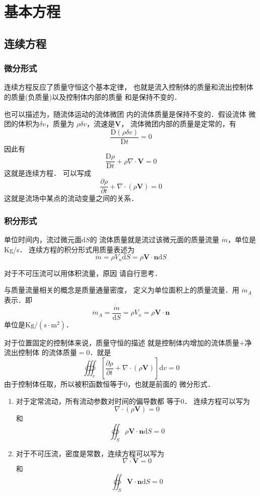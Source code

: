 
\chapter{基本方程}
\section{连续方程}
\subsection{微分形式}
连续方程反应了质量守恒这个基本定律，
也就是流入控制体的质量和流出控制体
的质量(负质量)以及控制体内部的质量
和是保持不变的．

也可以描述为，随流体运动的流体微团
内的流体质量是保持不变的．假设流体
微团的体积为$\delta v$，质量为
$\rho \delta v$，流速是$\mathbf{V}$，
流体微团内部的质量是定常的，有
\[
	\frac{\mathrm{D}(\rho \delta v)}{\mathrm{D} t }=0
\]
因此有
\[
	\frac{\mathrm{D}\rho}{\mathrm{D}t }+\rho
	\nabla \cdot \mathbf{V}=0
\]
这就是连续方程．
可以写成
\[
	\frac{\partial \rho}{\partial t }+
	\nabla \cdot (\rho \mathbf{V})=0
\]
这就是流场中某点的流动变量之间的关系．

\subsection{积分形式}
单位时间内，流过微元面$\mathrm{d} S $的
流体质量就是流过该微元面的质量流量
$\dot{m}$，单位是Kg/s．
连续方程的积分形式用质量表述为
\[
	\dot{m}=\rho V_n \mathrm{d}S=
	\rho \mathbf{V}\cdot \mathbf{n}
	\mathrm{d} S
\]
\begin{note}
	对于不可压流可以用体积流量，原因
	请自行思考．
\end{note}

与质量流量相关的概念是质量通量密度，
定义为单位面积上的质量流量．用
$\dot{m}_A$表示．即
\[
	\dot{m}_A=\frac{\dot{m}}{\mathrm{d} S }=
	\rho V_n =\rho \mathbf{V} \cdot \mathbf{n}
\]
单位是$\mathrm{Kg /(s\cdot m^2)}$．

对于位置固定的控制体来说，质量守恒的描述
就是控制体内增加的流体质量+净流出控制体
的流体质量$=0$．就是
\[
	\oiiint_v \left[\frac{\partial \rho}{\partial t }
		+\nabla \cdot (\rho \mathbf{V})\right]\mathrm{d}v
	=0
\]
由于控制体任取，所以被积函数恒等于0，也就是前面的
微分形式．

\begin{notice}
	\begin{enumerate}
		\item 对于定常流动，所有流动参数对时间的偏导数都
		      等于0．
		      连续方程可以写为
		      \[
			      \nabla \cdot (\rho\mathbf{V})=0
		      \]
		      和
		      \[
			      \oiint_S \rho \mathbf{V}\cdot \mathbf{n}
			      \mathrm{d} S=0
		      \]
		\item 对于不可压流，密度是常数，连续方程可以写为
		      \[
			      \nabla \cdot \mathbf{V}=0
		      \]
		      和
		      \[
			      \oiint_S \mathbf{V} \cdot \mathbf{n}
			      \mathrm{d} S=0
		      \]
	\end{enumerate}
\end{notice}

